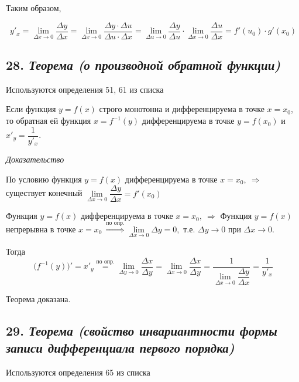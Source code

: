 Таким образом,

$$
y'_x=\lim\limits_{\Delta x \rightarrow 0}\dfrac{\Delta y}{\Delta x}=\lim\limits_{\Delta x \rightarrow 0}\dfrac{\Delta y\cdot \Delta u}{\Delta u \cdot \Delta x} = \lim\limits_{\Delta u \rightarrow 0}\dfrac{\Delta y}{\Delta u}\cdot \lim\limits_{\Delta x \rightarrow 0}\dfrac{\Delta u}{\Delta x} = f'(u_0)\cdot g'(x_0)
$$
\newpage 
\subsection*{28. \textit{Теорема (о производной обратной функции)}}
\begin{Quote2} 
\small\centering 

Используются определения 51, 61 из списка \end{Quote2} 

Если функция $y = f(x)$ строго монотонна и дифференцируема в точке $x = x_0$, то обратная ей функция $x = f^{-1}(y)$ дифференцируема в точке $y = f(x_0)$ и $x'_y = {\dfrac{1}{y'_x}}$.
\vspace*{20pt} 

\textit{Доказательство}

По условию функция $y = f(x)$ дифференцируема в точке $x = x_0, \ \Rightarrow$ существует конечный $\lim\limits_{\Delta x \rightarrow 0}{\dfrac{\Delta y}{\Delta x}} = f'(x_0)$

Функция $y = f(x)$ дифференцируема в точке $x = x_0, \ \Rightarrow$ Функция $y = f(x)$ непрерывна в точке $x = x_0 \ \overset{\text{по опр.}}{\Rightarrow} \lim\limits_{\Delta x \rightarrow 0}\Delta y = 0, \text{ т.е. } \Delta y \rightarrow 0 \text{ при } \Delta x \rightarrow 0$.

Тогда $$
\big(f^{-1}(y)\big)' = x'_y \overset{\text{по опр.}}{=} \lim\limits_{\Delta y \rightarrow 0} {\dfrac{\Delta x}{\Delta y}}=\lim\limits_{\Delta x \rightarrow 0} {\dfrac{\Delta x}{\Delta y}} = \dfrac{1}{\lim\limits_{\Delta x \rightarrow 0} {\dfrac{\Delta y}{\Delta x}}} = \dfrac{1}{y'_x}
$$

Теорема доказана.
\newpage 
\subsection*{29. \textit{Теорема (свойство инвариантности формы записи дифференциала первого порядка)}}
\begin{Quote2} 
\small\centering 

Используются определения 65 из списка \end{Quote2} 

